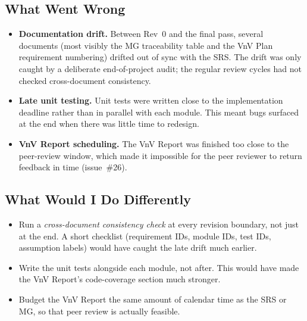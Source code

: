 \documentclass{article}
\begin{document}
\subsection{What Went Wrong}

\begin{itemize}
  \item \textbf{Documentation drift.} Between Rev~0 and the final pass,
  several documents (most visibly the MG traceability table and the VnV
  Plan requirement numbering) drifted out of sync with the SRS. The
  drift was only caught by a deliberate end-of-project audit; the regular
  review cycles had not checked cross-document consistency.
  \item \textbf{Late unit testing.} Unit tests were written close to the
  implementation deadline rather than in parallel with each module. This
  meant bugs surfaced at the end when there was little time to redesign.
  \item \textbf{VnV Report scheduling.} The VnV Report was finished too
  close to the peer-review window, which made it impossible for the peer
  reviewer to return feedback in time (issue~\#26).
\end{itemize}

\subsection{What Would I Do Differently}

\begin{itemize}
  \item Run a \emph{cross-document consistency check} at every revision
  boundary, not just at the end. A short checklist (requirement IDs,
  module IDs, test IDs, assumption labels) would have caught the late
  drift much earlier.
  \item Write the unit tests alongside each module, not after. This would
  have made the VnV Report's code-coverage section much stronger.
  \item Budget the VnV Report the same amount of calendar time as the SRS
  or MG, so that peer review is actually feasible.
\end{itemize}
\end{document}
